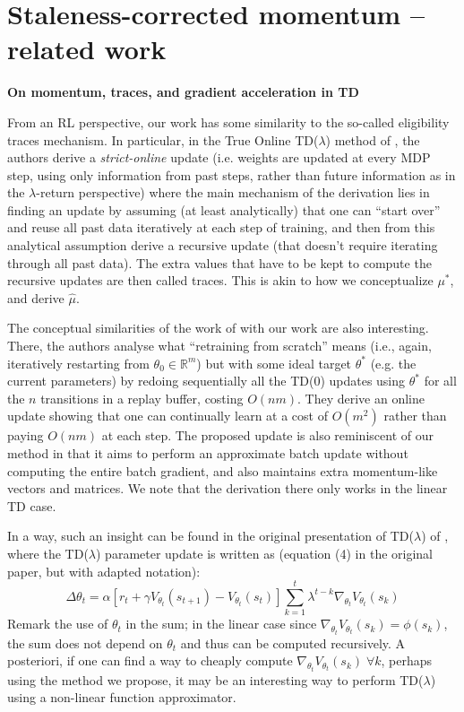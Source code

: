 \section{Staleness-corrected momentum -- related work}
\textbf{On momentum, traces, and gradient acceleration in TD} $\;\;$ 

From an RL perspective, our work has some similarity to the so-called eligibility traces mechanism. In particular, in the True Online TD($\lambda$) method of \citet{vanseijen2014true}, the authors derive a \emph{strict-online} update (i.e. weights are updated at every MDP step, using only information from past steps, rather than future information as in the $\lambda$-return perspective) where the main mechanism of the derivation lies in finding an update by assuming (at least analytically) that one can ``start over'' and reuse all past data iteratively at each step of training, and then from this analytical assumption derive a recursive update (that doesn't require iterating through all past data). The extra values that have to be kept to compute the recursive updates are then called traces. This is akin to how we conceptualize $\mu^*$, and derive $\hat \mu$.


The conceptual similarities of the work of \citet{vanseijen2015deeper} with our work are also interesting. There, the authors analyse what ``retraining from scratch'' means (i.e., again, iteratively restarting from $\theta_0 \in \mathbb{R}^m$) but with some ideal target $\theta^*$ (e.g. the current parameters) by redoing sequentially all the TD(0) updates using $\theta^*$ for all the $n$ transitions in a replay buffer, costing $O(nm)$. They derive an online update showing that one can continually learn at a cost of $O(m^2)$ rather than paying $O(nm)$ at each step. The proposed update is also reminiscent of our method in that it aims to perform an approximate batch update without computing the entire batch gradient, and also maintains extra momentum-like vectors and matrices. We note that the derivation there only works in the linear TD case. 

In a way, such an insight can be found in the original presentation of TD($\lambda$) of \citet{sutton1988learning}, where the TD($\lambda$) parameter update is written as (equation (4) in the original paper, but with adapted notation):
$$\Delta\theta_t = \alpha [r_t + \gamma V_{\theta_t}(s_{t+1}) - V_{\theta_t}(s_t)] \sum_{k=1}^t \lambda^{t-k} \nabla_{\theta_t} V_{\theta_t}(s_k)$$
Remark the use of $\theta_t$ in the sum; in the linear case since $\nabla_{\theta_t} V_{\theta_t}(s_k) = \phi(s_k)$, the sum does not depend on $\theta_t$ and thus can be computed recursively. A posteriori, if one can find a way to cheaply compute $\nabla_{\theta_t} V_{\theta_t}(s_k)\;\forall k$, perhaps using the method we propose, it may be an interesting way to perform TD($\lambda$) using a non-linear function approximator.
    
